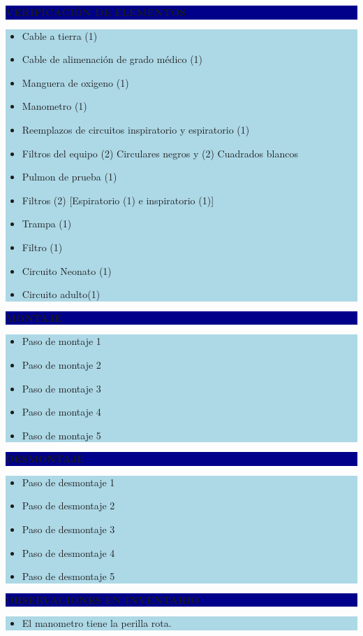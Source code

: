 \documentclass[11pt]{article}
\newcommand{\seccionbanda}[1]{%
  \vspace{0.6em}
  \noindent\colorbox{darkblue}{\parbox{\dimexpr\linewidth-2\fboxsep}{%
    \centering\color{white}\bfseries #1}}\par\vspace{0.6em}
}
\begin{document}
\newpage
\seccionbanda{VERIFICACIÓN DE ELEMENTOS}
\noindent\colorbox{lightblue}{\parbox{\dimexpr\linewidth-2\fboxsep\relax}{%
\begin{itemize}[label=$\square$, itemsep=4pt]
\item Cable a tierra (1)
\item Cable de alimenación de grado médico (1)
\item Manguera de oxigeno (1)
\item Manometro (1)
\item Reemplazos de circuitos inspiratorio y espiratorio (1)
\item Filtros del equipo (2) Circulares negros y (2) Cuadrados blancos
\item Pulmon de prueba (1)
\item Filtros (2) [Espiratorio (1) e inspiratorio (1)]
\item Trampa (1)
\item Filtro (1)
\item Circuito Neonato (1)
\item Circuito adulto(1)
\end{itemize}
}}\par

\seccionbanda{MONTAJE}
\noindent\colorbox{lightblue}{\parbox{\dimexpr\linewidth-2\fboxsep\relax}{%
\begin{itemize}[label=$\square$, itemsep=4pt]
\item Paso de montaje 1
\item Paso de montaje 2
\item Paso de montaje 3
\item Paso de montaje 4
\item Paso de montaje 5
\end{itemize}
}}\par

\seccionbanda{DESMONTAJE}
\noindent\colorbox{lightblue}{\parbox{\dimexpr\linewidth-2\fboxsep\relax}{%
\begin{itemize}[label=$\square$, itemsep=4pt]
\item Paso de desmontaje 1
\item Paso de desmontaje 2
\item Paso de desmontaje 3
\item Paso de desmontaje 4
\item Paso de desmontaje 5
\end{itemize}
}}\par
\seccionbanda{OBSERVACIONES EN INVENTARIO}
\noindent\colorbox{lightblue}{\parbox{\dimexpr\linewidth-2\fboxsep\relax}{\begin{itemize}[itemsep=4pt]
\item El manometro tiene la perilla rota.
\end{itemize}}}\par
\end{document}
